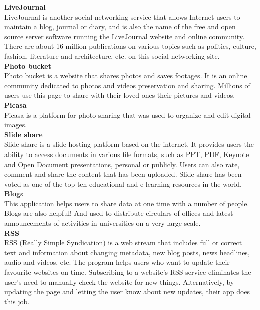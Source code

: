 \documentclass[12pt]{report}
\begin{document}
	\textbf{LiveJournal}\\
	LiveJournal is another social networking service that allows Internet users to maintain a blog, journal or diary, and is also the name of the free and open source server software running the LiveJournal website and online community. There are about 16 million publications on various topics such as politics, culture, fashion, literature and architecture, etc. on this social networking site. \\
	
  \textbf{Photo bucket }\\
	Photo bucket is a website that shares photos and saves footages. It is an online community dedicated to photos and videos preservation and sharing. Millions of users use this page to share with their loved ones their pictures and videos.\\
	
	\textbf{Picasa}\\
	Picasa is a platform for photo sharing that was used to organize and edit digital images.\\
	\textbf{Slide share} \\
	Slide share is a slide-hosting platform based on the internet. It provides users the ability to access documents in various file formats, such as PPT, PDF, Keynote and Open Document presentations, personal or publicly. Users can also rate, comment and share the content that has been uploaded. Slide share has been voted as one of the top ten educational and e-learning resources in the world.\\
	
	\textbf{Blog}s \\
	This application helps users to share data at one time with a number of people. Blogs are also helpful! And used to distribute circulars of offices and latest announcements of activities in universities on a very large scale.\\ 
	
	\textbf{RSS }\\
	RSS (Really Simple Syndication) is a web stream that includes full or correct text and information about changing metadata, new blog posts, news headlines, audio and videos, etc. The program helps users who want to update their favourite websites on time. Subscribing to a website's RSS service eliminates the user's need to manually check the website for new things. Alternatively, by updating the page and letting the user know about new updates, their app does this job.\\
	
\end{document}

